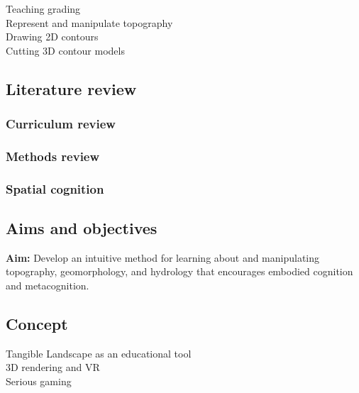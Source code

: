 \documentclass[final,3p,times,twocolumn]{elsarticle}
\begin{document}
\noindent
Teaching grading \\
Represent and manipulate topography \\
Drawing 2D contours \\
Cutting 3D contour models \\

\subsection{Literature review}

\subsubsection{Curriculum review}

\subsubsection{Methods review}

\subsubsection{Spatial cognition}

\subsection{Aims and objectives}
\noindent
\textbf{Aim:}
Develop an intuitive method for learning about and manipulating
topography, geomorphology, and hydrology
that encourages embodied cognition and metacognition. \\



\subsection{Concept}
\noindent
Tangible Landscape as an educational tool\\
3D rendering and VR \\
Serious gaming \\
\end{document}
